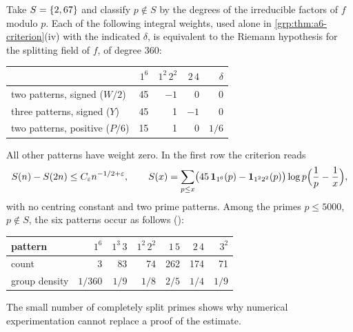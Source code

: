 \begin{example}
Take $S=\{2,67\}$ and classify $p\notin S$ by the degrees of the irreducible
factors of $f$ modulo $p$. Each of the following integral weights, used alone
in \cref{grp:thm:a6-criterion}(iv) with the indicated $\delta$, is equivalent
to the Riemann hypothesis for the splitting field of $f$, of degree $360$:
\begin{center}
\begin{tabular}{@{}lrrrr@{}}
\toprule
 & $1^6$ & $1^2\,2^2$ & $2\,4$ & $\delta$\\\midrule
two patterns, signed ($W/2$)&45&$-1$&0&0\\
three patterns, signed ($Y$)&45&1&$-1$&0\\
two patterns, positive ($P/6$)&15&1&0&$1/6$\\\bottomrule
\end{tabular}
\end{center}
All other patterns have weight zero. In the first row the criterion reads
\[
 S(n)-S(2n)\le C_\varepsilon n^{-1/2+\varepsilon},\qquad
 S(x)=\sum_{p\le x}\bigl(45\,\mathbf{1}_{1^6}(p)-\mathbf{1}_{1^2 2^2}(p)\bigr)
 \log p\Bigl(\frac1p-\frac1x\Bigr),
\]
with no centring constant and two prime patterns. Among the primes
$p\le5000$, $p\notin S$, the six patterns occur as follows
():
\begin{center}
\begin{tabular}{@{}lrrrrrr@{}}
\toprule
pattern & $1^6$ & $1^3\,3$ & $1^2\,2^2$ & $1\,5$ & $2\,4$ & $3^2$\\\midrule
count & 3 & 83 & 74 & 262 & 174 & 71\\
group density & $1/360$ & $1/9$ & $1/8$ & $2/5$ & $1/4$ & $1/9$\\\bottomrule
\end{tabular}
\end{center}
The small number of completely split primes shows why numerical
experimentation cannot replace a proof of the estimate.
\end{example}


